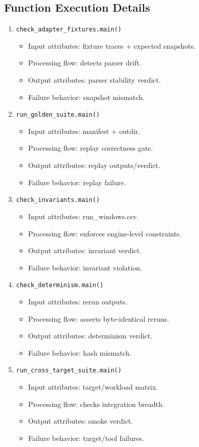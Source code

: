 \documentclass[11pt,a4paper]{article}
\begin{document}
\subsection*{Function Execution Details}
\begin{enumerate}[leftmargin=*]
  \item \texttt{check\_adapter\_fixtures.main()}
  \begin{itemize}[leftmargin=*]
    \item Input attributes: fixture traces + expected snapshots.
    \item Processing flow: detects parser drift.
    \item Output attributes: parser stability verdict.
    \item Failure behavior: snapshot mismatch.
  \end{itemize}
  \item \texttt{run\_golden\_suite.main()}
  \begin{itemize}[leftmargin=*]
    \item Input attributes: manifest + outdir.
    \item Processing flow: replay correctness gate.
    \item Output attributes: replay outputs/verdict.
    \item Failure behavior: replay failure.
  \end{itemize}
  \item \texttt{check\_invariants.main()}
  \begin{itemize}[leftmargin=*]
    \item Input attributes: run\_windows.csv.
    \item Processing flow: enforces engine-level constraints.
    \item Output attributes: invariant verdict.
    \item Failure behavior: invariant violation.
  \end{itemize}
  \item \texttt{check\_determinism.main()}
  \begin{itemize}[leftmargin=*]
    \item Input attributes: rerun outputs.
    \item Processing flow: asserts byte-identical reruns.
    \item Output attributes: determinism verdict.
    \item Failure behavior: hash mismatch.
  \end{itemize}
  \item \texttt{run\_cross\_target\_suite.main()}
  \begin{itemize}[leftmargin=*]
    \item Input attributes: target/workload matrix.
    \item Processing flow: checks integration breadth.
    \item Output attributes: smoke verdict.
    \item Failure behavior: target/tool failures.
  \end{itemize}
\end{enumerate}
\end{document}
